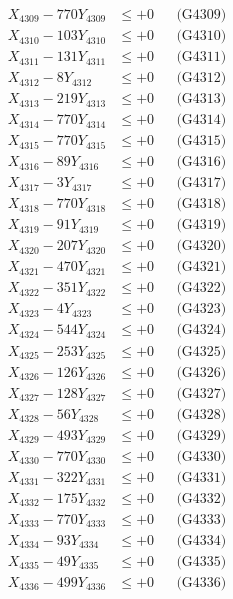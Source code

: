 \documentclass[a4paper,10pt]{article}
\begin{document}
{\begin{align}
X_{4309} - 770Y_{4309} &\leq +0 && \text{(G4309)} \\
X_{4310} - 103Y_{4310} &\leq +0 && \text{(G4310)} \\
\allowbreak
X_{4311} - 131Y_{4311} &\leq +0 && \text{(G4311)} \\
X_{4312} - 8Y_{4312} &\leq +0 && \text{(G4312)} \\
X_{4313} - 219Y_{4313} &\leq +0 && \text{(G4313)} \\
X_{4314} - 770Y_{4314} &\leq +0 && \text{(G4314)} \\
X_{4315} - 770Y_{4315} &\leq +0 && \text{(G4315)} \\
X_{4316} - 89Y_{4316} &\leq +0 && \text{(G4316)} \\
X_{4317} - 3Y_{4317} &\leq +0 && \text{(G4317)} \\
X_{4318} - 770Y_{4318} &\leq +0 && \text{(G4318)} \\
X_{4319} - 91Y_{4319} &\leq +0 && \text{(G4319)} \\
X_{4320} - 207Y_{4320} &\leq +0 && \text{(G4320)} \\
\allowbreak
X_{4321} - 470Y_{4321} &\leq +0 && \text{(G4321)} \\
X_{4322} - 351Y_{4322} &\leq +0 && \text{(G4322)} \\
X_{4323} - 4Y_{4323} &\leq +0 && \text{(G4323)} \\
X_{4324} - 544Y_{4324} &\leq +0 && \text{(G4324)} \\
X_{4325} - 253Y_{4325} &\leq +0 && \text{(G4325)} \\
X_{4326} - 126Y_{4326} &\leq +0 && \text{(G4326)} \\
X_{4327} - 128Y_{4327} &\leq +0 && \text{(G4327)} \\
X_{4328} - 56Y_{4328} &\leq +0 && \text{(G4328)} \\
X_{4329} - 493Y_{4329} &\leq +0 && \text{(G4329)} \\
X_{4330} - 770Y_{4330} &\leq +0 && \text{(G4330)} \\
\allowbreak
X_{4331} - 322Y_{4331} &\leq +0 && \text{(G4331)} \\
X_{4332} - 175Y_{4332} &\leq +0 && \text{(G4332)} \\
X_{4333} - 770Y_{4333} &\leq +0 && \text{(G4333)} \\
X_{4334} - 93Y_{4334} &\leq +0 && \text{(G4334)} \\
X_{4335} - 49Y_{4335} &\leq +0 && \text{(G4335)} \\
X_{4336} - 499Y_{4336} &\leq +0 && \text{(G4336)} \\

\end{align}}
\end{document}
